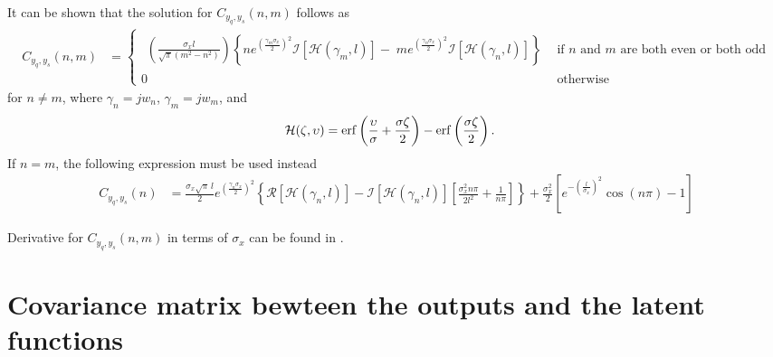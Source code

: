 \documentclass[a4paper,10pt]{article}
\DeclareMathOperator{\erf}{erf}
\begin{document}
It can be shown \cite{Alvarez:HeatEquationReport} that the solution
for $C_{y_q,y_s}(n,m)$ follows as
\begin{align}\label{eq:Cyqys_nm}
 C_{y_q,y_s}(n,m)&=
\begin{cases}
\begin{aligned}
\left(\frac{\sigma_x
l}{\sqrt{\pi}(m^2-n^2)}\right)\left\{ne^{\left(\frac{\gamma_m\sigma_x}{2}\right)^2}\mathcal{I}\left[\mathcal{H}
(\gamma_m,l)\right]-\;me^{\left(\frac{\gamma_n\sigma_x}{2}\right)^2}\mathcal{I}\left[\mathcal{H}(\gamma_n,l)\right]\right\}
\end{aligned}  & \mbox{if }n\mbox{ and }m\mbox{ are both even or both odd}\\
0&\mbox{otherwise}
\end{cases}
\end{align}
for $n\neq m$, where $\gamma_n=j w_n$, $\gamma_m=j w_m$, and  
\begin{align}
\notag \mathcal{H}(\zeta,\upsilon)&=\erf\left(\frac{\upsilon}{\sigma}+\frac{\sigma \zeta}{2}\right)-\erf\left(\frac{\sigma \zeta}{2}\right).
%
\end{align}
If $n=m$, the following expression must be used instead
\begin{align*}
C_{y_q,y_s}(n)
&=\frac{\sigma_x\sqrt{\pi}\,l}{2}e^{\left(\frac{\gamma_n\sigma_x}{2}\right)^2}\left\{\mathcal{R}\left[\mathcal{H}(\gamma_n,l)\right]
-\mathcal{I}\left[\mathcal{H}(\gamma_n,l)\right]\left[\frac{\sigma_x^2n\pi}{2l^2}+\frac{1}{n\pi}\right]\right\}
+\frac{\sigma^2_x}{2}\left[e^{-(\frac{l}{\sigma_x})^2}\cos(n\pi)-1\right]
\end{align*}

Derivative for $C_{y_q,y_s}(n,m)$ in terms of $\sigma_x$ can be found
in \cite{Alvarez:HeatEquationReport}.

\section{Covariance matrix bewteen the outputs and the latent functions}
\end{document}
